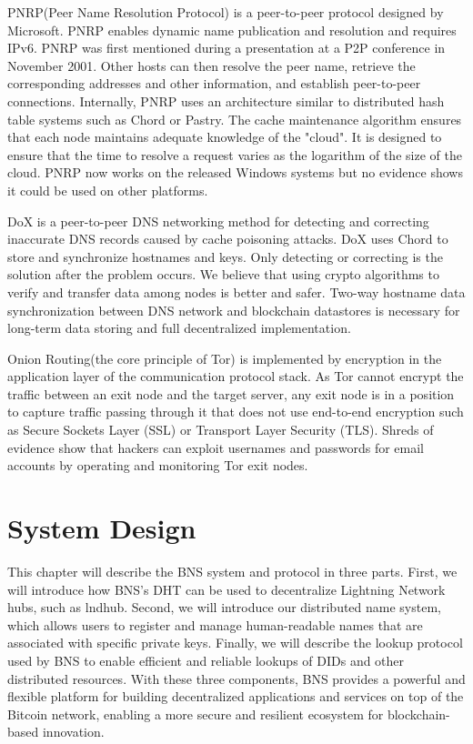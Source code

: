 \documentclass[twocolumn]{article}
\begin{document}
PNRP(Peer Name Resolution Protocol) is a peer-to-peer protocol designed by Microsoft. PNRP enables dynamic name publication and resolution and requires IPv6. PNRP was first mentioned during a presentation at a P2P conference in November 2001. Other hosts can then resolve the peer name, retrieve the corresponding addresses and other information, and establish peer-to-peer connections. Internally, PNRP uses an architecture similar to distributed hash table systems such as Chord or Pastry. The cache maintenance algorithm ensures that each node maintains adequate knowledge of the "cloud". It is designed to ensure that the time to resolve a request varies as the logarithm of the size of the cloud. PNRP now works on the released Windows systems but no evidence shows it could be used on other platforms.

DoX is a peer-to-peer DNS networking method for detecting and correcting inaccurate DNS records caused by cache poisoning attacks. DoX uses Chord to store and synchronize hostnames and keys. Only detecting or correcting is the solution after the problem occurs. We believe that using crypto algorithms to verify and transfer data among nodes is better and safer. Two-way hostname data synchronization between DNS network and blockchain datastores is necessary for long-term data storing and full decentralized implementation.

Onion Routing(the core principle of Tor\cite{TorNetwork}) is implemented by encryption in the application layer of the communication protocol stack. As Tor cannot encrypt the traffic between an exit node and the target server, any exit node is in a position to capture traffic passing through it that does not use end-to-end encryption such as Secure Sockets Layer (SSL) or Transport Layer Security (TLS). Shreds of evidence show that hackers can exploit usernames and passwords for email accounts by operating and monitoring Tor exit nodes.
\section{System Design}

This chapter will describe the BNS system and protocol in three parts. First, we will introduce how BNS's DHT can be used to decentralize Lightning Network hubs, such as lndhub. Second, we will introduce our distributed name system, which allows users to register and manage human-readable names that are associated with specific private keys. Finally, we will describe the lookup protocol used by BNS to enable efficient and reliable lookups of DIDs and other distributed resources. With these three components, BNS provides a powerful and flexible platform for building decentralized applications and services on top of the Bitcoin network, enabling a more secure and resilient ecosystem for blockchain-based innovation.
\end{document}
